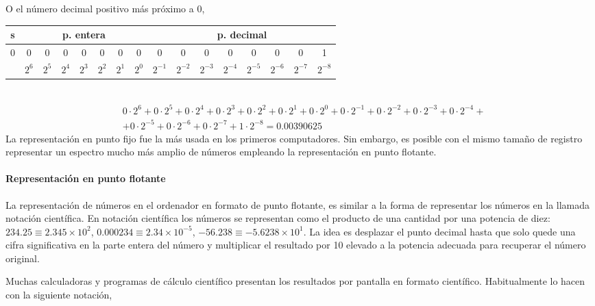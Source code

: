 O el número decimal positivo más próximo a 0,\\

\begin{tabular}{|c||c|c|c|c|c|c|c||c|c|c|c|c|c|c|c|}
\hline
s&\multicolumn{7}{c||}{p. entera}&\multicolumn{8}{c|}{p. decimal}\\
\hline
0&0&0&0&0&0&0&0&0&0&0&0&0&0&0&1\\
\hline
&$2^{6}$&$2^{5}$&$2^{4}$&$2^{3}$&$2^{2}$&$2^{1}$&$2^{0}$&$2^{-1}$&$2^{-2}$&$2^{-3}$&$2^{-4}$&$2^{-5}$&$2^{-6}$&$2^{-7}$&$2^{-8}$\\
\hline
\end{tabular}\\

\begin{equation*}
\begin{split}
&0\cdot 2^6+0 \cdot 2^5+ 0\cdot 2^4+ 0\cdot 2^3+ 0\cdot 2^2 + 0\cdot 2^1 + 0 \cdot 2^0 + 0 \cdot 2^{-1}+ 0 \cdot 2^{-2}+ 0 \cdot 2^{-3}+0 \cdot 2^{-4}+\\
&+ 0 \cdot 2^{-5}+0 \cdot 2^{-6} +0 \cdot 2^{-7}+1 \cdot 2^{-8} =  0.00390625
\end{split}
\end{equation*}
La representación en punto fijo fue la más usada en los primeros computadores. Sin embargo, es posible con el mismo tamaño de registro representar un espectro mucho más amplio de números empleando la representación en punto flotante.

\paragraph*{Representación en punto flotante} 
La representación de números en el ordenador en formato de punto flotante, es similar a la forma de representar los números en la llamada notación científica.  En notación científica los números se representan como el producto de una cantidad por una potencia de diez:
$234.25\equiv 2.345\times 10^2$, $0.000234\equiv 2.34\times 10^{-5}$, $-56.238 \equiv -5.6238\times 10^1$. La idea es desplazar el punto decimal hasta que solo quede una cifra significativa en la parte entera del número y multiplicar el resultado por 10 elevado a la potencia adecuada para recuperar el número original.

Muchas calculadoras y programas de cálculo científico presentan los resultados por pantalla en formato científico. Habitualmente lo hacen con la siguiente notación,

